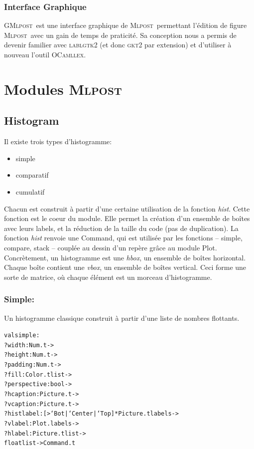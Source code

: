\documentclass[a4paper,12pt]{article}
\newcommand{\mlpost}{\textsc{Mlpost}}
\newcommand{\gmlpost}{\textsc{GMlpost}}
\begin{document}
\subsubsection{Interface Graphique}
\gmlpost\ est une interface graphique de \mlpost\ permettant l'édition de figure \mlpost\ avec un gain de temps de praticité. Sa conception nous a permis de devenir familier avec \textsc{lablgtk2} (et donc \textsc{gkt2} par extension) et d'utiliser à nouveau l'outil \textsc{OCamllex}.

\section{Modules \mlpost}

\subsection{Histogram}
Il existe trois types d'histogramme:
\begin{itemize}
\item simple
\item comparatif
\item cumulatif
\end{itemize}

Chacun est construit à partir d'une certaine utilisation de la fonction \textit{hist}. Cette fonction est le coeur du module. Elle permet la création d'un ensemble de boîtes avec leurs labels, et la réduction de la taille du code (pas de duplication). La fonction \textit{hist} renvoie une Command, qui est utilisée par les fonctions -- simple, compare, stack -- couplée au dessin d'un repère grâce au module Plot.
Concrètement, un histogramme est une \textit{hbox}, un ensemble de boîtes horizontal. Chaque boîte contient une \textit{vbox}, un ensemble de boîtes vertical. Ceci forme une sorte de matrice, où chaque élément est un morceau d'histogramme.

\subsubsection{Simple:}
Un histogramme classique construit à partir d'une liste de nombres
flottants.
\begin{alltt}
  val simple :
  ?width:Num.t ->
  ?height:Num.t ->
  ?padding:Num.t ->
  ?fill:Color.t list ->
  ?perspective: bool ->
  ?hcaption:Picture.t ->
  ?vcaption:Picture.t ->
  ?histlabel:[> `Bot | `Center | `Top ] * Picture.t labels ->
  ?vlabel:Plot.labels ->
  ?hlabel:Picture.t list -> 
  float list -> Command.t
\end{alltt}
\end{document}

